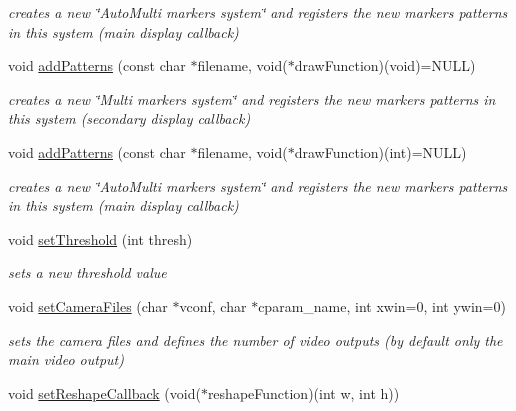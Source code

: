 \begin{DoxyCompactItemize}
\begin{DoxyCompactList}\small\item\em creates a new \char`\"{}\-Auto\-Multi markers system\char`\"{} and registers the new markers patterns in this system (main display callback) \end{DoxyCompactList}\item 
\hypertarget{classavr_application_a854b6dc36d8e647ffd07ac5ecd4e9a11}{void \hyperlink{classavr_application_a854b6dc36d8e647ffd07ac5ecd4e9a11}{add\-Patterns} (const char $\ast$filename, void($\ast$draw\-Function)(void)=N\-U\-L\-L)}\label{classavr_application_a854b6dc36d8e647ffd07ac5ecd4e9a11}

\begin{DoxyCompactList}\small\item\em creates a new \char`\"{}\-Multi markers system\char`\"{} and registers the new markers patterns in this system (secondary display callback) \end{DoxyCompactList}\item 
\hypertarget{classavr_application_afb26356f31325140cbf623d08cdbc90b}{void \hyperlink{classavr_application_afb26356f31325140cbf623d08cdbc90b}{add\-Patterns} (const char $\ast$filename, void($\ast$draw\-Function)(int)=N\-U\-L\-L)}\label{classavr_application_afb26356f31325140cbf623d08cdbc90b}

\begin{DoxyCompactList}\small\item\em creates a new \char`\"{}\-Auto\-Multi markers system\char`\"{} and registers the new markers patterns in this system (main display callback) \end{DoxyCompactList}\item 
\hypertarget{classavr_application_a2bfb6a28314fd0e9207d1d50c245313b}{void \hyperlink{classavr_application_a2bfb6a28314fd0e9207d1d50c245313b}{set\-Threshold} (int thresh)}\label{classavr_application_a2bfb6a28314fd0e9207d1d50c245313b}

\begin{DoxyCompactList}\small\item\em sets a new threshold value \end{DoxyCompactList}\item 
void \hyperlink{classavr_application_a27c801a3483c796d7987eca14444fc22}{set\-Camera\-Files} (char $\ast$vconf, char $\ast$cparam\-\_\-name, int xwin=0, int ywin=0)
\begin{DoxyCompactList}\small\item\em sets the camera files and defines the number of video outputs (by default only the main video output) \end{DoxyCompactList}\item 
\hypertarget{classavr_application_a1c22de4137bf8f3d898265b0989ede8e}{void \hyperlink{classavr_application_a1c22de4137bf8f3d898265b0989ede8e}{set\-Reshape\-Callback} (void($\ast$reshape\-Function)(int w, int h))}\label{classavr_application_a1c22de4137bf8f3d898265b0989ede8e}


\end{DoxyCompactItemize}
